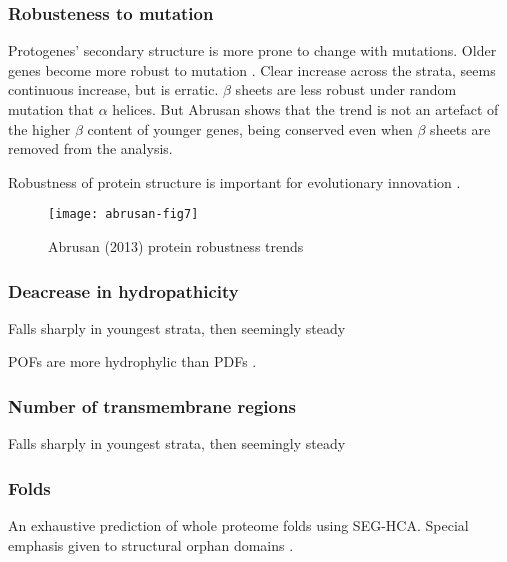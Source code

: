     \subsubsection{Robusteness to mutation}

        Protogenes' secondary structure is more prone to change with
        mutations.  Older genes become more robust to mutation
        \cite{abrusan_integration_2013}. Clear increase across the strata,
        seems continuous increase, but is erratic. $\beta$ sheets are less
        robust under random mutation that $\alpha$ helices. But Abrusan
        shows that the trend is not an artefact of the higher $\beta$
        content of younger genes, being conserved even when $\beta$ sheets
        are removed from the analysis.

        Robustness of protein structure is important for evolutionary
        innovation \cite{bloom_structural_2006, bloom_protein_2006,
        bloom_evolution_2007}.

        \begin{figure}[h!] \centering
            \texttt{[image: abrusan-fig7]} \caption{Abrusan
            (2013) protein robustness trends} \end{figure}

    \subsubsection{Deacrease in hydropathicity}

        Falls sharply in youngest strata, then seemingly steady
        \cite{carvunis_proto-genes_2012}

        POFs are more hydrophylic than PDFs \cite{gollery_what_2006}.

    \subsubsection{Number of transmembrane regions}

        Falls sharply in youngest strata, then seemingly steady
        \cite{carvunis_proto-genes_2012}
        

    \subsubsection{Folds}

        An exhaustive prediction of whole proteome folds using SEG-HCA. Special
        emphasis given to structural orphan domains \cite{faure_comprehensive_2013}.

